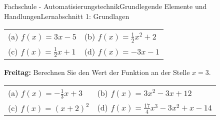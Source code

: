 \documentclass[oneside,openany,headings=optiontotoc,11pt,numbers=noenddot]{scrreprt}
\begin{document}
\begin{worksheet}{Fachschule - Automatisierungstechnik}{Grundlegende Elemente und Handlungen}{Lernabschnitt 1: Grundlagen}
\begin{framed}
			\begin{tabularx}{\textwidth}{XX}
				(a) \(f(x) = 3x-5\) & (b) \(f(x) = \frac{1}{2}x^2 + 2 \)\\
				(c) \(f(x) = \frac{1}{2}x +1\) & (d) \(f(x) = -3x-1\)
			\end{tabularx}
		\end{framed}
		\begin{framed}
			\noindent
			\textbf{Freitag:} Berechnen Sie den Wert der Funktion an der Stelle \(x = 3\).\\
			\begin{tabularx}{\textwidth}{XX}
				(a) \(f(x) = -\frac{1}{3}x + 3\) & (b) \(f(x) = 3x^2 - 3x + 12\)\\
				(c) \(f(x) = (x+2)^2\) & (d) \(f(x) = \frac{17}{4}x^3 - 3x^2 + x - 14\)
			\end{tabularx}
		\end{framed}
	\end{worksheet}
\end{document}
